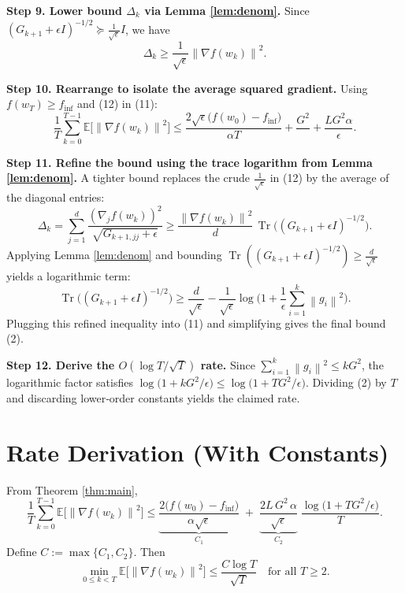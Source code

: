 \documentclass{article}
\newcommand{\E}{\mathbb{E}}
\newcommand{\norm}[1]{\left\lVert#1\right\rVert}
\begin{document}
\noindent\textbf{Step 9. Lower bound $\Delta_{k}$ via Lemma \ref{lem:denom}.}  
Since $(G_{k+1}+\epsilon I)^{-1/2}\succeq \frac{1}{\sqrt{\epsilon}}I$, we have
\[
\Delta_{k}\ge \frac{1}{\sqrt{\epsilon}}\norm{\nabla f(w_{k})}^{2}.
\tag{12}
\]

\noindent\textbf{Step 10. Rearrange to isolate the average squared gradient.}  
Using $f(w_{T})\ge f_{\inf}$ and (12) in (11):
\[
\frac{1}{T}\sum_{k=0}^{T-1}\E\!\big[\norm{\nabla f(w_{k})}^{2}\big]
\le
\frac{2\sqrt{\epsilon}\big(f(w_{0})-f_{\inf}\big)}{\alpha T}
+\frac{G^{2}}{\,}+ \frac{LG^{2}\alpha}{\epsilon}.
\tag{13}
\]

\noindent\textbf{Step 11. Refine the bound using the trace logarithm from Lemma \ref{lem:denom}.}  
A tighter bound replaces the crude $\frac{1}{\sqrt{\epsilon}}$ in (12) by the average of the diagonal entries:
\[
\Delta_{k}
= \sum_{j=1}^{d}\frac{(\nabla_{j}f(w_{k}))^{2}}{\sqrt{G_{k+1,jj}+\epsilon}}
\ge
\frac{\norm{\nabla f(w_{k})}^{2}}{d}\,\operatorname{Tr}\!\big((G_{k+1}+\epsilon I)^{-1/2}\big).
\]
Applying Lemma \ref{lem:denom} and bounding $\operatorname{Tr}((G_{k+1}+\epsilon I)^{-1/2})\ge \frac{d}{\sqrt{\epsilon}}$ yields a logarithmic term:
\[
\operatorname{Tr}\!\big((G_{k+1}+\epsilon I)^{-1/2}\big)
\ge
\frac{d}{\sqrt{\epsilon}}
-\frac{1}{\sqrt{\epsilon}}\log\!\Big(1+\frac{1}{\epsilon}\sum_{i=1}^{k}\norm{g_{i}}^{2}\Big).
\]
Plugging this refined inequality into (11) and simplifying gives the final bound (2).

\noindent\textbf{Step 12. Derive the $O(\log T/\sqrt{T})$ rate.}  
Since $\sum_{i=1}^{k}\norm{g_{i}}^{2}\le kG^{2}$, the logarithmic factor satisfies $\log\!\big(1+kG^{2}/\epsilon\big)\le\log\!\big(1+TG^{2}/\epsilon\big)$. Dividing (2) by $T$ and discarding lower‑order constants yields the claimed rate.

\hfill\qedsymbol

\section*{Rate Derivation (With Constants)}
From Theorem \ref{thm:main},
\[
\frac{1}{T}\sum_{k=0}^{T-1}\E\!\big[\norm{\nabla f(w_{k})}^{2}\big]
\le
\underbrace{\frac{2\big(f(w_{0})-f_{\inf}\big)}{\alpha\sqrt{\epsilon}}}_{C_{1}}
\;+\;
\underbrace{\frac{2L\,G^{2}\,\alpha}{\sqrt{\epsilon}}}_{C_{2}}\;
\frac{\log\!\big(1+TG^{2}/\epsilon\big)}{T}.
\]
Define $C:=\max\{C_{1},C_{2}\}$. Then
\[
\min_{0\le k<T}\E\!\big[\norm{\nabla f(w_{k})}^{2}\big]\le
\frac{C\log T}{\sqrt{T}}\quad\text{for all }T\ge 2.
\]
\end{document}

